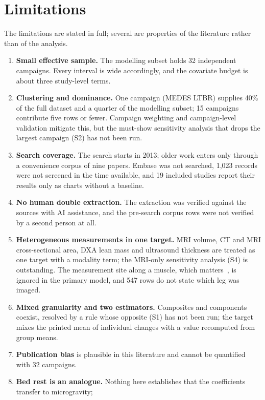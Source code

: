 \section{Limitations}
\label{sec:limitations}

The limitations are stated in full; several are properties of the literature rather than of the analysis.

\begin{enumerate}
  \item \textbf{Small effective sample.} The modelling subset holds 32 independent campaigns. Every interval is wide
        accordingly, and the covariate budget is about three study-level terms.
  \item \textbf{Clustering and dominance.} One campaign (MEDES LTBR) supplies 40\% of the full dataset and a quarter of
        the modelling subset; 15 campaigns contribute five rows or fewer. Campaign weighting and campaign-level
        validation mitigate this, but the must-show sensitivity analysis that drops the largest campaign (S2) has not
        been run.
  \item \textbf{Search coverage.} The search starts in 2013; older work enters only through a convenience corpus of
        nine papers. Embase was not searched, 1,023 records were not screened in the time available, and 19 included
        studies report their results only as charts without a baseline.
  \item \textbf{No human double extraction.} The extraction was verified against the sources with AI assistance, and
        the pre-search corpus rows were not verified by a second person at all.
  \item \textbf{Heterogeneous measurements in one target.} MRI volume, CT and MRI cross-sectional area, DXA lean mass
        and ultrasound thickness are treated as one target with a modality term; the MRI-only sensitivity analysis
        (S4) is outstanding. The measurement site along a muscle, which matters~\citep{miokovic2012}, is ignored in
        the primary model, and 547 rows do not state which leg was imaged.
  \item \textbf{Mixed granularity and two estimators.} Composites and components coexist, resolved by a rule whose
        opposite (S1) has not been run; the target mixes the printed mean of individual changes with a value
        recomputed from group means.
  \item \textbf{Publication bias} is plausible in this literature and cannot be quantified with 32 campaigns.
  \item \textbf{Bed rest is an analogue.} Nothing here establishes that the coefficients transfer to microgravity;

\end{enumerate}
